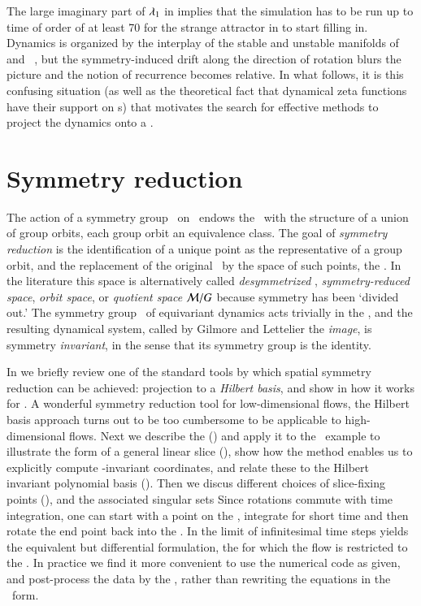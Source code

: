 \documentclass[preprint,number,sort&compress]{elsarticle}
\begin{document}
The large imaginary part of $\eigExp_{1}$ in
 implies that the simulation has to be
run up to time of order of at least 70 for the strange
attractor in  to start filling in. Dynamics
is organized by the interplay of the stable and unstable
manifolds of \eqv\  and \reqv\ , but the
symmetry-induced drift along the direction of rotation blurs
the picture and the notion of recurrence becomes relative. In
what follows, it is this confusing situation (as well as the
theoretical fact that dynamical zeta functions have
their support on \rpo s) that motivates the search for
effective methods to project the dynamics onto a \reducedsp.


\section{\label{s:symmRed} Symmetry reduction}

The action of a symmetry group \Group\ on \pS\ endows the
\statesp\ with the structure of a union of group orbits, each
group orbit an equivalence class. The goal of {\em symmetry
reduction} is the identification of a unique point as the
representative of a group orbit, and the replacement of the
original \statesp\ by the space of such points, the {\em
\reducedsp}. In the literature this space is alternatively
called
\emph{desymmetrized \statesp},
\emph{symmetry-reduced space},
\emph{orbit space}, or \emph{quotient space}
${\cal M}/G$ because symmetry has been `divided out.' {The}
symmetry group \Group\ of equi\-vari\-ant dynamics acts trivially
in {the} \reducedsp, and the resulting dynamical system,
called by Gilmore and Lettelier the
\emph{image}, is symmetry {\em in\-vari\-ant}, in the sense that
its symmetry group is the identity.

In  we briefly review one of the standard
tools by which spatial symmetry reduction can be achieved:
projection to a \emph{Hilbert basis}, and show in
 how it works for \cLf. A wonderful
symmetry reduction tool for low-dimensional flows, the
Hilbert basis approach turns out to be too cumbersome to be
applicable to high-dimensional flows. Next we describe the
\emph{\mframes} () and apply it to the \cLf\
example to illustrate the form of a general linear slice
(), show how the method enables us
to explicitly compute \Group-in\-vari\-ant coordinates, and
relate these to the Hilbert in\-vari\-ant polynomial basis
(). Then we discus different choices
of slice-fixing points (), and the
associated singular sets%
Since rotations commute with time integration, one can
start with a point on the \slice,
integrate for short time and then rotate the
end point back into the \slice.
In  the limit of
infinitesimal time steps yields the equivalent but differential
formulation, the \emph{\mslices} for which the flow is restricted to
the \reducedsp.
In practice we find it more convenient to use the
numerical code as given, and post-process the data by the \mframes,
rather than rewriting the equations in the \mslices\ form.
\end{document}
